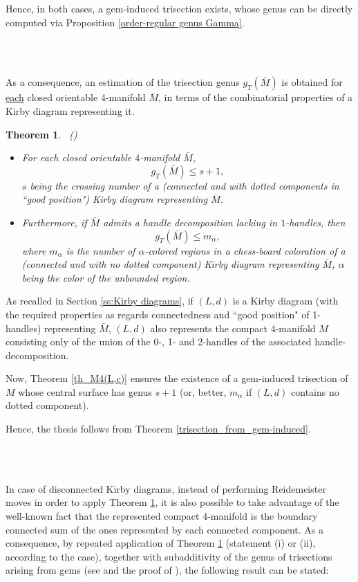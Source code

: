 \documentclass[12pt,a4paper]{article}
\newtheorem{theorem}[lemma]{Theorem}
\newcommand{\qed}{\\ \rightline{$\Box$ \ \ \ \ \ \ \ \ \ \ \ \ \ \ \ }\\}
\begin{document}
Hence, in both cases, a gem-induced trisection exists, whose genus can  be directly computed via Proposition \ref{order-regular genus Gamma}. 

\ \qed

\medskip

As a consequence, an estimation of the trisection genus $g_T(\bar M)$ is obtained for \underline{each} closed orientable 4-manifold $\bar M$, in terms of the combinatorial properties of a Kirby diagram representing  it.  


\begin{theorem}\label{trisection_from_Kirby-diagram} \  {\rm (\cite{Casali-Cristofori trisection bis})} \ 
\begin{itemize}
\item[(i)]
For each closed orientable $4$-manifold $\bar M$,  
$$g_T(\bar M) \le s+1,$$  $s$ being the crossing number of a (connected and with dotted components in ``good position") Kirby diagram representing $\bar M$. 
\item[(ii)] Furthermore, if  $\bar M$ admits a handle decomposition lacking in $1$-handles, then 
$$g_T(\bar M) \le m_\alpha,$$ where
$m_{\alpha}$ is  the number of $\alpha$-colored regions in a chess-board coloration of a (connected and with no dotted component) Kirby diagram representing  $\bar M$, $\alpha$ being the color of the unbounded region.
\end{itemize}

\end{theorem}

\par \noindent  
As recalled in Section \ref{ss:Kirby diagrams}, if $(L,d)$ is a Kirby diagram (with the required properties as regards connectedness and ``good position" of 1-handles) representing $\bar M$, $(L,d)$ also represents the compact 4-manifold $M$ consisting only of the union of the 0-, 1- and 2-handles of the associated handle-decomposition. 

Now, Theorem \ref{th_M4(L,c)} ensures the existence of a gem-induced trisection of $M$ whose central surface has genus $s+1$ (or, better, $m_\alpha$ if $(L,d)$ contains no dotted component). 

Hence, the thesis follows from Theorem \ref{trisection_from_gem-induced}. 

\ \qed

\medskip

In case of disconnected Kirby diagrams, instead of performing Reidemeister moves in order to apply Theorem \ref{trisection_from_Kirby-diagram}, it is also possible to take advantage of the well-known fact that the represented compact $4$-manifold is the boundary connected sum of the ones represented by each connected component.  As a consequence, by repeated application of Theorem \ref{trisection_from_Kirby-diagram} (statement (i) or (ii), according to the case), together with subadditivity of the genus of trisections arising from gems (see \cite[Proposition 3.8(iv)]{Casali-Cristofori trisection bis} and the proof of \cite[Proposition 4.4]{Casali-Cristofori trisection bis}), the following result can be stated:  
\end{document}
